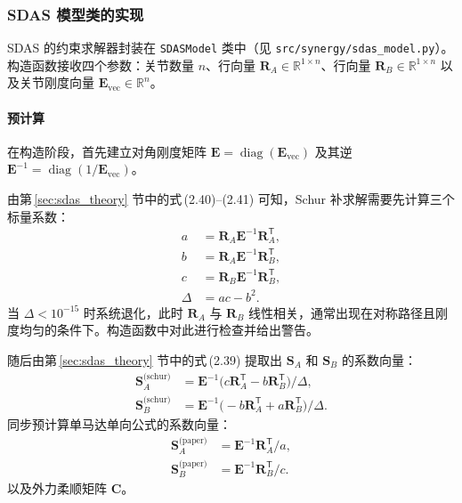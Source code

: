 \subsubsection{SDAS 模型类的实现}
\label{sec:sdas_class}

SDAS 的约束求解器封装在 \verb|SDASModel| 类中（见 \verb|src/synergy/sdas_model.py|）。构造函数接收四个参数：关节数量 $n$、行向量 $\mathbf{R}_A \in \mathbb{R}^{1 \times n}$、行向量 $\mathbf{R}_B \in \mathbb{R}^{1 \times n}$ 以及关节刚度向量 $\mathbf{E}_{\text{vec}} \in \mathbb{R}^{n}$。

\paragraph{预计算}

在构造阶段，首先建立对角刚度矩阵 $\mathbf{E} = \operatorname{diag}(\mathbf{E}_{\text{vec}})$ 及其逆 $\mathbf{E}^{-1} = \operatorname{diag}(1/\mathbf{E}_{\text{vec}})$。

由第\,\ref{sec:sdas_theory} 节中的式\,(2.40)--(2.41) 可知，Schur 补求解需要先计算三个标量系数：
\begin{align}
    a &= \mathbf{R}_A \mathbf{E}^{-1} \mathbf{R}_A^{\mathsf{T}}, \nonumber\\
    b &= \mathbf{R}_A \mathbf{E}^{-1} \mathbf{R}_B^{\mathsf{T}}, \nonumber\\
    c &= \mathbf{R}_B \mathbf{E}^{-1} \mathbf{R}_B^{\mathsf{T}}, \label{eq:schur_scalars}\\
    \Delta &= a c - b^2. \label{eq:schur_det}
\end{align}
当 $\Delta < 10^{-15}$ 时系统退化，此时 $\mathbf{R}_A$ 与 $\mathbf{R}_B$ 线性相关，通常出现在对称路径且刚度均匀的条件下。构造函数中对此进行检查并给出警告。

随后由第\,\ref{sec:sdas_theory} 节中的式\,(2.39) 提取出 $\mathbf{S}_A$ 和 $\mathbf{S}_B$ 的系数向量：
\begin{align}
    \mathbf{S}_A^{\text{(schur)}} &= \mathbf{E}^{-1}\big(c \mathbf{R}_A^{\mathsf{T}} - b \mathbf{R}_B^{\mathsf{T}}\big) / \Delta, \label{eq:schur_SA}\\
    \mathbf{S}_B^{\text{(schur)}} &= \mathbf{E}^{-1}\big(-b \mathbf{R}_A^{\mathsf{T}} + a \mathbf{R}_B^{\mathsf{T}}\big) / \Delta. \label{eq:schur_SB}
\end{align}
同步预计算单马达单向公式的系数向量：
\begin{align}
    \mathbf{S}_A^{\text{(paper)}} &= \mathbf{E}^{-1} \mathbf{R}_A^{\mathsf{T}} / a, \label{eq:paper_SA}\\
    \mathbf{S}_B^{\text{(paper)}} &= \mathbf{E}^{-1} \mathbf{R}_B^{\mathsf{T}} / c. \label{eq:paper_SB}
\end{align}
以及外力柔顺矩阵 $\mathbf{C}$。

